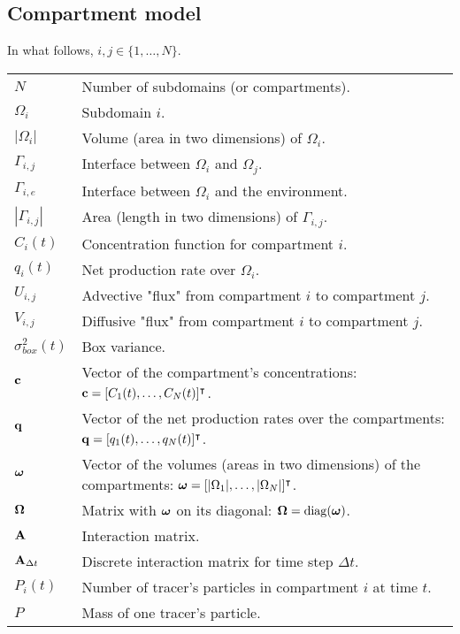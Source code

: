 \subsection*{Compartment model}
In what follows, $i,j \in \{1,\dots,N\}$.
\begin{table}[H]
\begin{tabular}{ll}
	$N$ & Number of subdomains (or compartments).\\
	$\Omega_i$ & Subdomain $i$.\\
	$|\Omega_i|$ & Volume (area in two dimensions) of $\Omega_i$.\\
	$\Gamma_{i,j}$ & Interface between $\Omega_i$ and $\Omega_j$.\\
	$\Gamma_{i,e}$ & Interface between $\Omega_i$ and the environment.\\
	$|\Gamma_{i,j}|$ & Area (length in two dimensions) of $\Gamma_{i,j}$.\\
	$C_i(t)$ & Concentration function for compartment $i$.\\
	$q_i(t)$ & Net production rate over $\Omega_i$.\\
	$U_{i,j}$ & Advective "flux" from compartment $i$ to compartment $j$.\\
	$V_{i,j}$ & Diffusive "flux" from compartment $i$ to compartment $j$.\\
	$\sigma_{box}^2(t)$ & Box variance.\\
	$\mathbf c$ & Vector of the compartment's concentrations: $\mathbf c = [C_1(t),\dots,C_N(t)]^\intercal$.\\
	$\mathbf q$ & Vector of the net production rates over the compartments: $\mathbf q = [q_1(t),\dots,q_N(t)]^\intercal$.\\
	$\boldsymbol \omega$ & Vector of the volumes (areas in two dimensions) of the compartments: $\boldsymbol \omega = [|\Omega_1|,\dots,|\Omega_N|]^\intercal$.\\
	$\boldsymbol \Omega$ & Matrix with $\boldsymbol \omega$ on its diagonal: $\boldsymbol \Omega = \operatorname{diag} (\boldsymbol \omega)$.\\
	$\mathbf A$ & Interaction matrix.\\
	$\mathbf A_{\Delta t}$ & Discrete interaction matrix for time step $\Delta t$.\\
	$P_i(t)$ & Number of tracer's particles in compartment $i$ at time $t$.\\
	$P$ & Mass of one tracer's particle.\\
\end{tabular}
\end{table}
